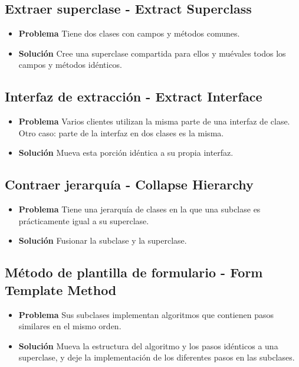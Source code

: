 \documentclass[11pt,a4paper,oneside]{book}
\begin{document}
\subsection{Extraer superclase - Extract Superclass}
\label{renombrarmetodo}
\begin{itemize}
    \item \textbf{Problema} Tiene dos clases con campos y métodos comunes.
    \item \textbf{Solución} Cree una superclase compartida para ellos y muévales todos los campos y métodos idénticos.
\end{itemize}

\subsection{Interfaz de extracción - Extract Interface}
\label{renombrarmetodo}
\begin{itemize}
    \item \textbf{Problema} Varios clientes utilizan la misma parte de una interfaz de clase. Otro caso: parte de la interfaz en dos clases es la misma.
    \item \textbf{Solución} Mueva esta porción idéntica a su propia interfaz.
\end{itemize}

\subsection{Contraer jerarquía - Collapse Hierarchy}
\label{renombrarmetodo}
\begin{itemize}
    \item \textbf{Problema} Tiene una jerarquía de clases en la que una subclase es prácticamente igual a su superclase.
    \item \textbf{Solución} Fusionar la subclase y la superclase.
\end{itemize}

\subsection{Método de plantilla de formulario - Form Template Method}
\label{renombrarmetodo}
\begin{itemize}
    \item \textbf{Problema} Sus subclases implementan algoritmos que contienen pasos similares en el mismo orden.
    \item \textbf{Solución}  Mueva la estructura del algoritmo y los pasos idénticos a una superclase, y deje la implementación de los diferentes pasos en las subclases.
\end{itemize}
\end{document}
